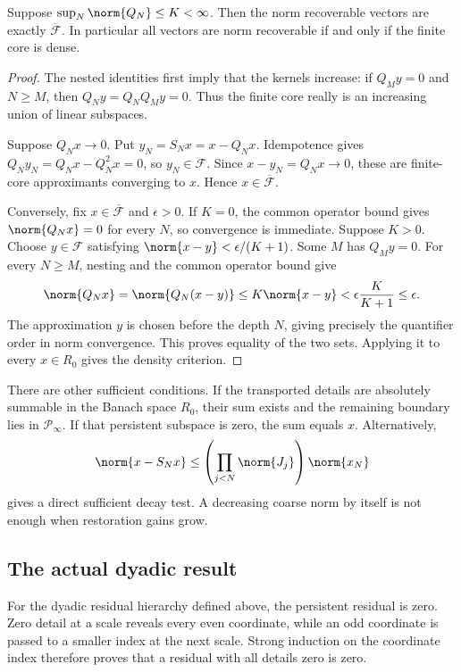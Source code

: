 \begin{theorem}\label{KS27}
Suppose \(\sup_N\norm{Q_N}\le K<\infty\). Then the norm recoverable vectors are exactly \(\overline{\mathcal F}\). In particular all vectors are norm recoverable if and only if the finite core is dense.
\end{theorem}
\begin{proof}
The nested identities first imply that the kernels increase: if $Q_My=0$ and $N\ge M$, then $Q_Ny=Q_NQ_My=0$. Thus the finite core really is an increasing union of linear subspaces.

Suppose $Q_Nx\to0$. Put $y_N=S_Nx=x-Q_Nx$. Idempotence gives $Q_Ny_N=Q_Nx-Q_N^2x=0$, so $y_N\in\mathcal F$. Since $x-y_N=Q_Nx\to0$, these are finite-core approximants converging to $x$. Hence $x\in\overline{\mathcal F}$.

Conversely, fix $x\in\overline{\mathcal F}$ and $\epsilon>0$. If $K=0$, the common operator bound gives $\norm{Q_Nx}=0$ for every $N$, so convergence is immediate. Suppose $K>0$. Choose $y\in\mathcal F$ satisfying $\norm{x-y}<\epsilon/(K+1)$. Some $M$ has $Q_My=0$. For every $N\ge M$, nesting and the common operator bound give
\[
 \norm{Q_Nx}=\norm{Q_N(x-y)}\le K\norm{x-y}
 <\epsilon\frac{K}{K+1}\le\epsilon.
\]
The approximation $y$ is chosen before the depth $N$, giving precisely the quantifier order in norm convergence. This proves equality of the two sets. Applying it to every $x\in R_0$ gives the density criterion.
\end{proof}
There are other sufficient conditions. If the transported details are absolutely summable in the Banach space \(R_0\), their sum exists and the remaining boundary lies in \(\mathcal P_\infty\). If that persistent subspace is zero, the sum equals \(x\). Alternatively,
\[
 \norm{x-S_Nx}\le\left(\prod_{j<N}\norm{J_j}\right)\norm{x_N}
\]
gives a direct sufficient decay test. A decreasing coarse norm by itself is not enough when restoration gains grow.

\subsection{The actual dyadic result}
For the dyadic residual hierarchy defined above, the persistent residual is zero. Zero detail at a scale reveals every even coordinate, while an odd coordinate is passed to a smaller index at the next scale. Strong induction on the coordinate index therefore proves that a residual with all details zero is zero.

